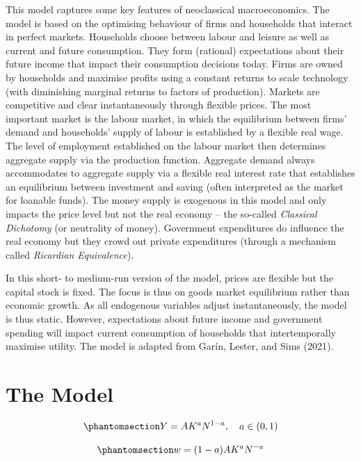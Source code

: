 \documentclass[
  letterpaper,
  DIV=11,
  numbers=noendperiod]{scrreprt}
\begin{document}
This model captures some key features of neoclassical macroeconomics.
The model is based on the optimising behaviour of firms and households
that interact in perfect markets. Households choose between labour and
leisure as well as current and future consumption. They form (rational)
expectations about their future income that impact their consumption
decisions today. Firms are owned by households and maximise profits
using a constant returns to scale technology (with diminishing marginal
returns to factors of production). Markets are competitive and clear
instantaneously through flexible prices. The most important market is
the labour market, in which the equilibrium between firms' demand and
households' supply of labour is established by a flexible real wage. The
level of employment established on the labour market then determines
aggregate supply via the production function. Aggregate demand always
accommodates to aggregate supply via a flexible real interest rate that
establishes an equilibrium between investment and saving (often
interpreted as the market for loanable funds). The money supply is
exogenous in this model and only impacts the price level but not the
real economy -- the so-called \emph{Classical Dichotomy} (or neutrality
of money). Government expenditures do influence the real economy but
they crowd out private expenditures (through a mechanism called
\emph{Ricardian Equivalence}).

In this short- to medium-run version of the model, prices are flexible
but the capital stock is fixed. The focus is thus on goods market
equilibrium rather than economic growth. As all endogenous variables
adjust instantaneously, the model is thus static. However, expectations
about future income and government spending will impact current
consumption of households that intertemporally maximise utility. The
model is adapted from Garín, Lester, and Sims (2021).

\section{The Model}\label{the-model}

\begin{equation}\phantomsection\label{eq-Y_NC}{
Y=AK^aN^{1-a}, \quad a\in (0,1)
}\end{equation}

\begin{equation}\phantomsection\label{eq-w_NC}{
w=(1-a)AK^aN^{-a}
}\end{equation}
\end{document}
